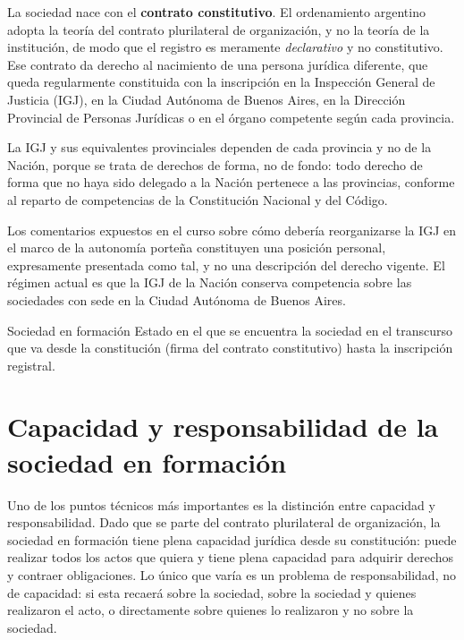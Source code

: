 \documentclass[12pt,oneside]{book}
\begin{document}
La sociedad nace con el \textbf{contrato constitutivo}. El ordenamiento argentino adopta la teoría del contrato plurilateral de organización, y no la teoría de la institución, de modo que el registro es meramente \emph{declarativo} y no constitutivo. Ese contrato da derecho al nacimiento de una persona jurídica diferente, que queda regularmente constituida con la inscripción en la Inspección General de Justicia (IGJ), en la Ciudad Autónoma de Buenos Aires, en la Dirección Provincial de Personas Jurídicas o en el órgano competente según cada provincia.

La IGJ y sus equivalentes provinciales dependen de cada provincia y no de la Nación, porque se trata de derechos de forma, no de fondo: todo derecho de forma que no haya sido delegado a la Nación pertenece a las provincias, conforme al reparto de competencias de la Constitución Nacional y del Código.

\begin{note}
Los comentarios expuestos en el curso sobre cómo debería reorganizarse la IGJ en el marco de la autonomía porteña constituyen una posición personal, expresamente presentada como tal, y no una descripción del derecho vigente. El régimen actual es que la IGJ de la Nación conserva competencia sobre las sociedades con sede en la Ciudad Autónoma de Buenos Aires.
\end{note}

\begin{definition}{Sociedad en formación}
Estado en el que se encuentra la sociedad en el transcurso que va desde la constitución (firma del contrato constitutivo) hasta la inscripción registral.
\end{definition}

\section{Capacidad y responsabilidad de la sociedad en formación}
\label{sec:capacidad}

Uno de los puntos técnicos más importantes es la distinción entre capacidad y responsabilidad. Dado que se parte del contrato plurilateral de organización, la sociedad en formación tiene plena capacidad jurídica desde su constitución: puede realizar todos los actos que quiera y tiene plena capacidad para adquirir derechos y contraer obligaciones. Lo único que varía es un problema de responsabilidad, no de capacidad: si esta recaerá sobre la sociedad, sobre la sociedad y quienes realizaron el acto, o directamente sobre quienes lo realizaron y no sobre la sociedad.
\end{document}
